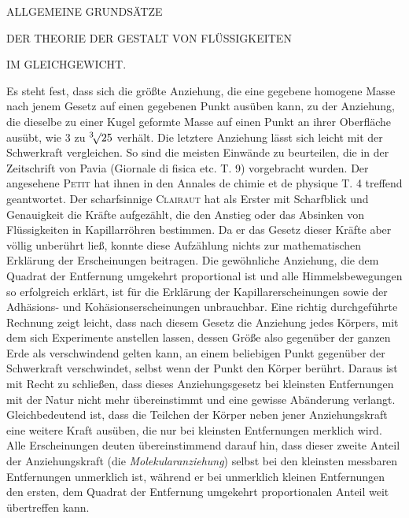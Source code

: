 \renewcommand{\Article}[1]{\par\medskip\Needspace{4\baselineskip}\pdfbookmark[1]{Art. #1}{fluidorum-art-#1}\centerline{\textbf{#1.}}\nobreak\smallskip}
\par\medskip
\centerline{ALLGEMEINE GRUNDSÄTZE}
\centerline{DER THEORIE DER GESTALT VON FLÜSSIGKEITEN}
\centerline{IM GLEICHGEWICHT.}
\medskip
\expandafter\def\csname HistoricalNoteText4\endcsname{Es steht fest, dass sich die größte Anziehung, die eine gegebene homogene Masse nach jenem Gesetz auf einen gegebenen Punkt ausüben kann, zu der Anziehung, die dieselbe zu einer Kugel geformte Masse auf einen Punkt an ihrer Oberfläche ausübt, wie $3$ zu $\BareRoot[3]{25}$ verhält. Die letztere Anziehung lässt sich leicht mit der Schwerkraft vergleichen.}
\expandafter\def\csname HistoricalNoteText5\endcsname{So sind die meisten Einwände zu beurteilen, die in der Zeitschrift von Pavia (Giornale di fisica etc. T. 9) vorgebracht wurden. Der angesehene \textsc{Petit} hat ihnen in den Annales de chimie et de physique T. 4 treffend geantwortet.}
Der scharfsinnige \textsc{Clairaut} hat als Erster mit Scharfblick und Genauigkeit die Kräfte aufgezählt, die den Anstieg oder das Absinken von Flüssigkeiten in Kapillarröhren bestimmen. Da er das Gesetz dieser Kräfte aber völlig unberührt ließ, konnte diese Aufzählung nichts zur mathematischen Erklärung der Erscheinungen beitragen. Die gewöhnliche Anziehung, die dem Quadrat der Entfernung umgekehrt proportional ist und alle Himmelsbewegungen so erfolgreich erklärt, ist für die Erklärung der Kapillarerscheinungen sowie der Adhäsions- und Kohäsionserscheinungen unbrauchbar. Eine richtig durchgeführte Rechnung zeigt leicht, dass nach diesem Gesetz die Anziehung jedes Körpers, mit dem sich Experimente anstellen lassen, dessen Größe also gegenüber der ganzen Erde als verschwindend gelten kann, an einem beliebigen Punkt gegenüber der Schwerkraft verschwindet, selbst wenn der Punkt den Körper berührt. Daraus ist mit Recht zu schließen, dass dieses Anziehungsgesetz bei kleinsten Entfernungen mit der Natur nicht mehr übereinstimmt und eine gewisse Abänderung verlangt. Gleichbedeutend ist, dass die Teilchen der Körper neben jener Anziehungskraft eine weitere Kraft ausüben, die nur bei kleinsten Entfernungen merklich wird. Alle Erscheinungen deuten übereinstimmend darauf hin, dass dieser zweite Anteil der Anziehungskraft (die \textit{Molekularanziehung}) selbst bei den kleinsten messbaren Entfernungen unmerklich ist, während er bei unmerklich kleinen Entfernungen den ersten, dem Quadrat der Entfernung umgekehrt proportionalen Anteil weit übertreffen kann.


